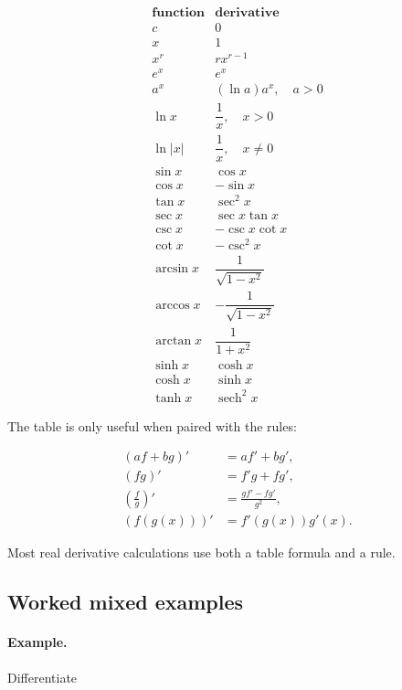 \[
\boxed{
\begin{array}{c|c}
\textbf{function} & \textbf{derivative} \\ \hline
c & 0 \\[3pt]
x & 1 \\[3pt]
x^r & rx^{r-1} \\[3pt]
e^x & e^x \\[3pt]
a^x & (\ln a)a^x,\quad a>0 \\[3pt]
\ln x & \dfrac1x,\quad x>0 \\[8pt]
\ln|x| & \dfrac1x,\quad x\neq0 \\[8pt]
\sin x & \cos x \\[3pt]
\cos x & -\sin x \\[3pt]
\tan x & \sec^2x \\[3pt]
\sec x & \sec x\tan x \\[3pt]
\csc x & -\csc x\cot x \\[3pt]
\cot x & -\csc^2x \\[3pt]
\arcsin x & \dfrac1{\sqrt{1-x^2}} \\[8pt]
\arccos x & -\dfrac1{\sqrt{1-x^2}} \\[8pt]
\arctan x & \dfrac1{1+x^2} \\[8pt]
\sinh x & \cosh x \\[3pt]
\cosh x & \sinh x \\[3pt]
\tanh x & \operatorname{sech}^2x
\end{array}
}
\]

The table is only useful when paired with the rules:

\[
\boxed{
\begin{aligned}
(af+bg)'&=af'+bg',\\
(fg)'&=f'g+fg',\\
\left(\frac fg\right)'&=\frac{gf'-fg'}{g^2},\\
(f(g(x)))'&=f'(g(x))g'(x).
\end{aligned}
}
\]

Most real derivative calculations use both a table formula and a rule.

\subsection{Worked mixed examples}
\label{subsec:worked-mixed-derivative-examples}

\paragraph{Example.}
Differentiate

